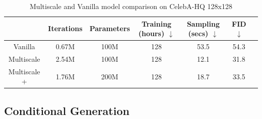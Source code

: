 \begin{table}[h!]
    \begin{center}
    \caption{Multiscale and Vanilla model comparison on CelebA-HQ 128x128}
    \label{ch2:tbl:CelebA}
    \begin{tabular}{ccccccc}
    \toprule
    & Iterations & Parameters & Training (hours) $\downarrow$  & Sampling (secs) $\downarrow$ & FID $\downarrow$ \\
    \midrule
    \multirow{1}{*}{Vanilla} 
    &0.67M & 100M & 128  & 53.5 & 54.3    \\
    \midrule
    \multirow{1}{*}{Multiscale}
    &2.54M & 100M & 128  & 12.1 & 31.8 \\

    \midrule
    \multirow{1}{*}{Multiscale +}
    &1.76M & 200M & 128  & 18.7 & 33.5  \\
    \bottomrule
    \end{tabular}
    \end{center}
\end{table}

\subsection{Conditional Generation}
\label{ch2:Conditional Generation_experiments}

